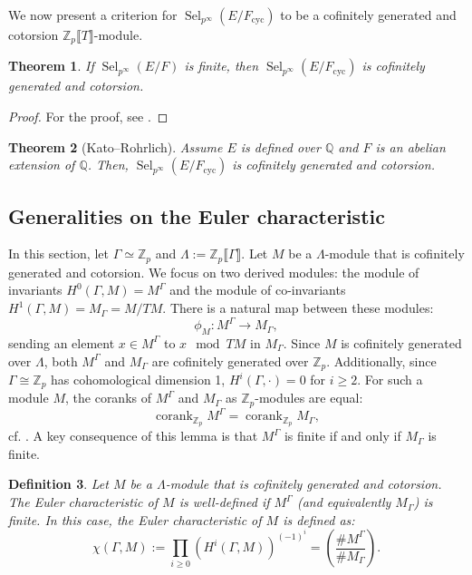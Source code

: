 \documentclass[12pt]{amsart}
\newtheorem{theorem}{Theorem}[section]
\newtheorem{definition}[theorem]{Definition}
\newcommand{\Z}{\mathbb{Z}}
\newcommand{\op}[1]{\operatorname{#1}}
\numberwithin{equation}{section}
\begin{document}
We now present a criterion for $\op{Sel}_{p^\infty}(E/F_{\op{cyc}})$ to be a cofinitely generated and cotorsion $\Z_p\llbracket T\rrbracket$-module.

\begin{theorem}
    If $\op{Sel}_{p^\infty}(E/F)$ is finite, then $\op{Sel}_{p^\infty}(E/F_{\op{cyc}})$ is cofinitely generated and cotorsion.
\end{theorem}

\begin{proof}
    For the proof, see \cite[Theorem 1.4]{GreenbergIwasawa}.
\end{proof}

\begin{theorem}[Kato–Rohrlich]
    Assume $E$ is defined over $\mathbb{Q}$ and $F$ is an abelian extension of $\mathbb{Q}$. Then, $\op{Sel}_{p^\infty}(E/F_{\op{cyc}})$ is cofinitely generated and cotorsion.
\end{theorem}
\subsection{Generalities on the Euler characteristic}
In this section, let $\Gamma\simeq \Z_p$ and $\Lambda:=\Z_p\llbracket \Gamma \rrbracket$. Let $ M $ be a $\Lambda$-module that is cofinitely generated and cotorsion. We focus on two derived modules: the module of invariants $ H^0(\Gamma, M) = M^\Gamma $ and the module of co-invariants $ H^1(\Gamma, M) = M_\Gamma = M / TM $. There is a natural map between these modules:
\[
\phi_M: M^\Gamma \rightarrow M_\Gamma,
\]
sending an element $ x \in M^\Gamma $ to $ x \mod{TM} $ in $ M_\Gamma $. Since $ M $ is cofinitely generated over $\Lambda$, both $ M^\Gamma $ and $ M_\Gamma $ are cofinitely generated over $\Z_p$. Additionally, since $\Gamma \cong \Z_p$ has cohomological dimension 1, $ H^i(\Gamma, \cdot) = 0 $ for $ i \geq 2 $. For such a module $ M $, the coranks of $ M^\Gamma $ and $ M_\Gamma $ as $\Z_p$-modules are equal:
    \[
    \operatorname{corank}_{\Z_p} M^\Gamma = \operatorname{corank}_{\Z_p} M_\Gamma,
    \]
cf. \cite[Lemma 2.1]{stats1}. A key consequence of this lemma is that $ M^\Gamma $ is finite if and only if $ M_\Gamma $ is finite.

\begin{definition}
    Let $ M $ be a $\Lambda$-module that is cofinitely generated and cotorsion. The \emph{Euler characteristic} of $ M $ is well-defined if $ M^\Gamma $ (and equivalently $ M_\Gamma $) is finite. In this case, the \emph{Euler characteristic} of $ M $ is defined as:
    \[
    \chi(\Gamma, M) := \prod_{i \geq 0} \left(H^i(\Gamma, M)\right)^{(-1)^i} = \left(\frac{\# M^\Gamma}{\# M_\Gamma}\right).
    \]
\end{definition}
\end{document}
